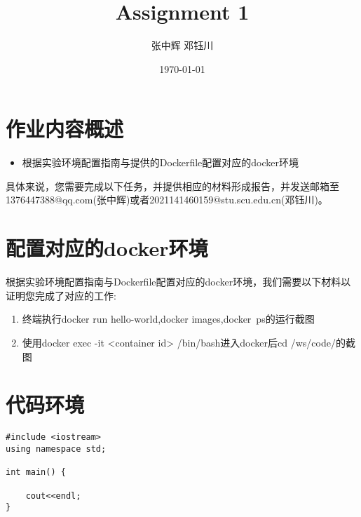 \documentclass[a4,10pt]{ctexart}
\begin{document}
\title{Assignment 1}
\author{张中辉 \quad 邓钰川}
\date{\today}
\maketitle
\tableofcontents
\newpage
{}
\newpage

\section{作业内容概述}
\begin{itemize}
    \item 根据实验环境配置指南与提供的Dockerfile配置对应的docker环境
    
\end{itemize}
具体来说，您需要完成以下任务，并提供相应的材料形成报告，并发送邮箱至1376447388@qq.com(张中辉)或者2021141460159@stu.scu.edu.cn(邓钰川)。

\section{配置对应的docker环境}
根据实验环境配置指南与Dockerfile配置对应的docker环境，我们需要以下材料以证明您完成了对应的工作:
\begin{enumerate}
    \item 终端执行docker run hello-world,docker images,docker ps的运行截图
    \item 使用docker exec -it <container id> /bin/bash进入docker后cd /ws/code/的截图
\end{enumerate}

\section{代码环境}
\begin{verbatim}
#include <iostream>
using namespace std;

int main() {

    cout<<endl;
}
\end{verbatim}
\end{document}
